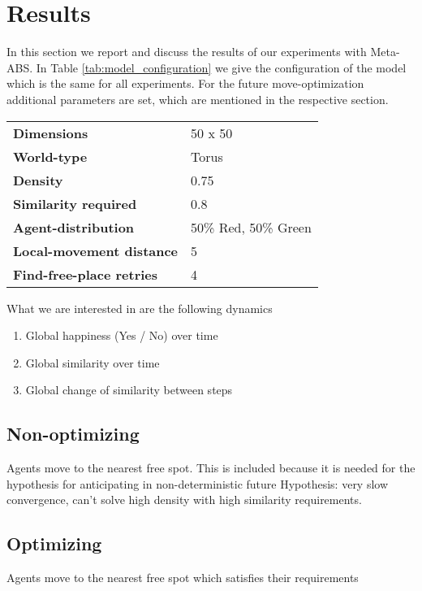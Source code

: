 \section{Results}
In this section we report and discuss the results of our experiments with Meta-ABS. In Table \ref{tab:model_configuration} we give the configuration of the model which is the same for all experiments. For the future move-optimization additional parameters are set, which are mentioned in the respective section.

\begin{table*}[t]
	\centering
	\caption{Model Configuration}
	\label{tab:model_configuration}
		\begin{tabular}{ l | l }
			\hline \hline
			\textbf{Dimensions}					& 50 x 50 \\  
			\textbf{World-type}					& Torus	\\ 
			\textbf{Density}					& 0.75	\\ 
			\textbf{Similarity required}		& 0.8	\\ 
			\textbf{Agent-distribution}			& 50\% Red, 50\% Green	\\ 
			\textbf{Local-movement distance}	& 5	\\ 
			\textbf{Find-free-place retries}	& 4	\\ 
			\hline \hline
		\end{tabular}
\end{table*}


What we are interested in are the following dynamics
\begin{enumerate}
	\item Global happiness (Yes / No) over time
	\item Global similarity over time
	\item Global change of similarity between steps
\end{enumerate}

\subsection{Non-optimizing}
Agents move to the nearest free spot. This is included because it is needed for the hypothesis for anticipating in non-deterministic future
Hypothesis: very slow convergence, can't solve high density with high similarity requirements.

\subsection{Optimizing}
Agents move to the nearest free spot which satisfies their requirements


